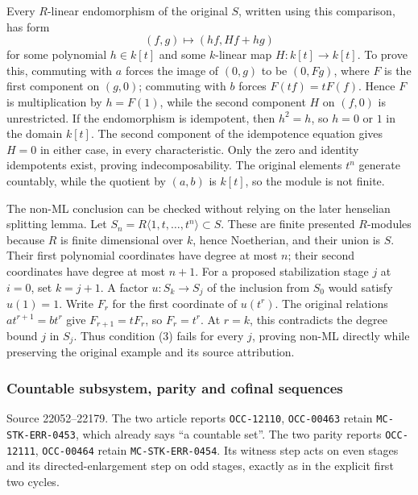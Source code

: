 Every \(R\)-linear endomorphism of the original \(S\), written using this comparison, has form \[
(f,g)\longmapsto(hf,Hf+hg)
\] for some polynomial \(h\in k[t]\) and some \(k\)-linear map \(H:k[t]\to k[t]\). To prove this, commuting with \(a\) forces the image of \((0,g)\) to be \((0,Fg)\), where \(F\) is the first component on \((g,0)\); commuting with \(b\) forces \(F(tf)=tF(f)\). Hence \(F\) is multiplication by \(h=F(1)\), while the second component \(H\) on \((f,0)\) is unrestricted. If the endomorphism is idempotent, then \(h^2=h\), so \(h=0\) or \(1\) in the domain \(k[t]\). The second component of the idempotence equation gives \(H=0\) in either case, in every characteristic. Only the zero and identity idempotents exist, proving indecomposability. The original elements \(t^n\) generate countably, while the quotient by \((a,b)\) is \(k[t]\), so the module is not finite.

The non-ML conclusion can be checked without relying on the later henselian splitting lemma. Let \(S_n=R\langle1,t,\ldots,t^n\rangle\subset S\). These are finite presented \(R\)-modules because \(R\) is finite dimensional over \(k\), hence Noetherian, and their union is \(S\). Their first polynomial coordinates have degree at most \(n\); their second coordinates have degree at most \(n+1\). For a proposed stabilization stage \(j\) at \(i=0\), set \(k=j+1\). A factor \(u:S_k\to S_j\) of the inclusion from \(S_0\) would satisfy \(u(1)=1\). Write \(F_r\) for the first coordinate of \(u(t^r)\). The original relations \(at^{r+1}=bt^r\) give \(F_{r+1}=tF_r\), so \(F_r=t^r\). At \(r=k\), this contradicts the degree bound \(j\) in \(S_j\). Thus condition (3) fails for every \(j\), proving non-ML directly while preserving the original example and its source attribution.

\subsubsection{Countable subsystem, parity and cofinal sequences}\label{countable-subsystem-parity-and-cofinal-sequences}

Source 22052--22179. The two article reports \texttt{OCC-12110}, \texttt{OCC-00463} retain \texttt{MC-STK-ERR-0453}, which already says ``a countable set''. The two parity reports \texttt{OCC-12111}, \texttt{OCC-00464} retain \texttt{MC-STK-ERR-0454}. Its witness step acts on even stages and its directed-enlargement step on odd stages, exactly as in the explicit first two cycles.

